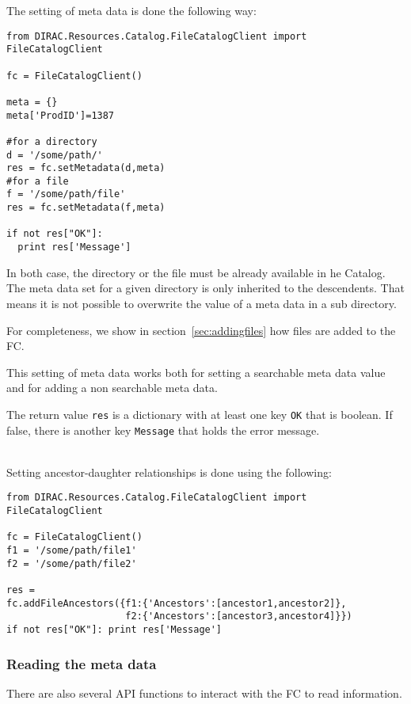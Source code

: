 \documentclass[11pt,a4paper]{scrartcl}
\begin{document}
The setting of meta data is done the following way:
\begin{lstlisting}
from DIRAC.Resources.Catalog.FileCatalogClient import FileCatalogClient

fc = FileCatalogClient()

meta = {}
meta['ProdID']=1387

#for a directory
d = '/some/path/' 
res = fc.setMetadata(d,meta)
#for a file
f = '/some/path/file'
res = fc.setMetadata(f,meta)

if not res["OK"]:
  print res['Message']
\end{lstlisting}
In both case, the directory or the file must be already available in he Catalog. 
The meta data set for a given directory is only inherited to the descendents.
That means it is not possible to overwrite the value of a meta data in a sub
directory.

For completeness, we show in section~\ref{sec:addingfiles} how files are
added to the FC.

This setting of meta data works both for setting a searchable meta data value
and for adding a non searchable meta data.

The return value \lstinline|res| is a dictionary with at least one key
\lstinline|OK| that is boolean. If false, there is another key
\lstinline|Message| that holds the error message.

~\\

Setting ancestor-daughter relationships is done using the following:
\begin{lstlisting}
from DIRAC.Resources.Catalog.FileCatalogClient import FileCatalogClient

fc = FileCatalogClient()
f1 = '/some/path/file1'
f2 = '/some/path/file2'

res =
fc.addFileAncestors({f1:{'Ancestors':[ancestor1,ancestor2]},
                     f2:{'Ancestors':[ancestor3,ancestor4]}})
if not res["OK"]: print res['Message']
\end{lstlisting}

\subsubsection{Reading the meta data}
There are also several API functions to interact with the FC to read
information. 
\end{document}
